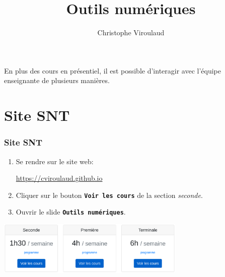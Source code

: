 \documentclass[svgnames,11pt]{beamer}
\author[]{Christophe Viroulaud}
\title{Outils numériques}
\date{}
\institute{Seconde - SNT}
\begin{document}
\begin{frame}
\titlepage
\end{frame}
\begin{frame}
    \frametitle{}

En plus des cours en présentiel, il est possible d'interagir avec l'équipe enseignante de plusieurs manières.

\vspace{2cm}

\end{frame}
\section{Site SNT}
\begin{frame}
    \frametitle{Site SNT}

\begin{activite}
\begin{enumerate}
    \item Se rendre sur le site web:
    \begin{center}
        {\Large \url{https://cviroulaud.github.io}}
    \end{center}
    \item Cliquer sur le bouton \textbf{\texttt{Voir les cours}} de la section \emph{seconde}.
    \item Ouvrir le slide \textbf{\texttt{Outils numériques}}.
\end{enumerate}
\end{activite}
\begin{center}
\centering
\includegraphics[width=9cm]{ressources/site.png}
\label{IMG}
\end{center}
\end{frame}
\end{document}
